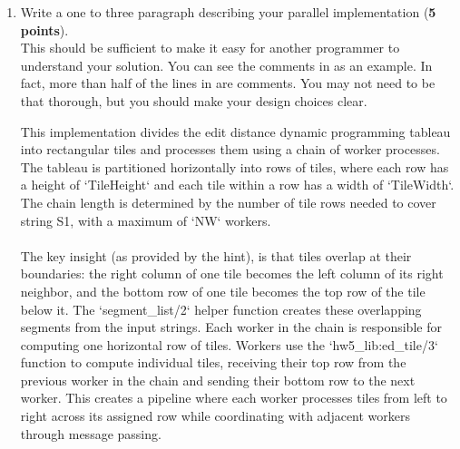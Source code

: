 \documentclass{article}
\newenvironment{answer}
{\par\color{blue}}
{\normalfont\par}
\begin{document}
\begin{enumerate}
\begin{enumerate}
                    to piazza.  We'll work it out.
              \item Write a one to three paragraph describing your parallel implementation
                    (\textbf{5 points}).\\
                    This should be sufficient to make it easy for another programmer to understand your solution.
                    You can see the comments in
                    as an example.
                    In fact, more than half of the lines in
                    are comments.
                    You may not need to be that thorough, but you should make your design choices clear.
                    \begin{answer}
                        This implementation divides the edit distance dynamic programming tableau into rectangular tiles
                        and processes them using a chain of worker processes. The tableau is partitioned horizontally
                        into rows of tiles, where each row has a height of `TileHeight` and each tile within a row has a
                        width of `TileWidth`. The chain length is determined by the number of tile rows needed to cover
                        string S1, with a maximum of `NW` workers.
                        \\ \\
                        The key insight (as provided by the hint), is that tiles overlap at their boundaries:
                        the right column of one tile becomes the left column of its right neighbor, and the
                        bottom row of one tile becomes the top row of the tile below it. The `segment\_list/2`
                        helper function creates these overlapping segments from the input strings. Each worker
                        in the chain is responsible for computing one horizontal row of tiles. Workers use the
                        `hw5\_lib:ed\_tile/3` function to compute individual tiles, receiving their top row
                        from the previous worker in the chain and sending their bottom row to the next worker.
                        This creates a pipeline where each worker processes tiles from left to right across its
                        assigned row while coordinating with adjacent workers through message passing.
                        \\ \\

\end{answer}
\end{enumerate}
\end{enumerate}
\end{document}

